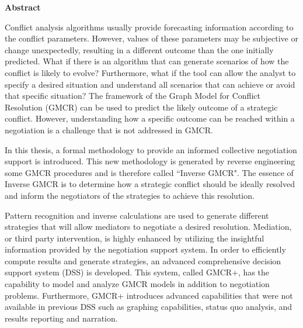 \documentclass[letterpaper,12pt,titlepage,oneside,final]{book}
\let\origdoublepage\cleardoublepage
\newcommand{\clearemptydoublepage}{%
  \clearpage{\pagestyle{empty}\origdoublepage}}
\let\cleardoublepage\clearemptydoublepage
\begin{document}
\cleardoublepage %
 



  


\begin{center}\textbf{Abstract}\end{center}
\label{ABSTRACT}

Conflict analysis algorithms usually provide forecasting information according to the conflict parameters. However, values of these parameters may be subjective or change unexpectedly, resulting in a different outcome than the one initially predicted. %
What if there is an algorithm that can generate scenarios of how the conflict is likely to evolve? Furthermore, what if the tool can allow the analyst to specify a desired situation and understand all scenarios that can achieve or avoid that specific situation? The framework of the Graph Model for Conflict Resolution (GMCR) can be used to predict the likely outcome of a strategic conflict. However, understanding how a specific outcome can be reached within a negotiation is a challenge that is not addressed in GMCR.

In this thesis, a formal methodology to provide an informed collective negotiation support is introduced. This new methodology is generated by reverse engineering some GMCR procedures and is therefore called ``Inverse GMCR". The essence of Inverse GMCR is to determine how a strategic conflict should be ideally resolved and inform the negotiators of the strategies to achieve this resolution. 

Pattern recognition and inverse calculations are used to generate different strategies that will allow mediators to negotiate a desired resolution. Mediation, or third party intervention, is highly enhanced by utilizing the insightful information provided by the negotiation support system. In order to efficiently compute results and generate strategies, an advanced comprehensive decision support system (DSS) is developed. This system, called GMCR+, has the capability to model and analyze GMCR models in addition to negotiation problems. Furthermore, GMCR+ introduces advanced capabilities that were not available in previous DSS such as graphing capabilities, status quo analysis, and results reporting and narration.
\end{document}
